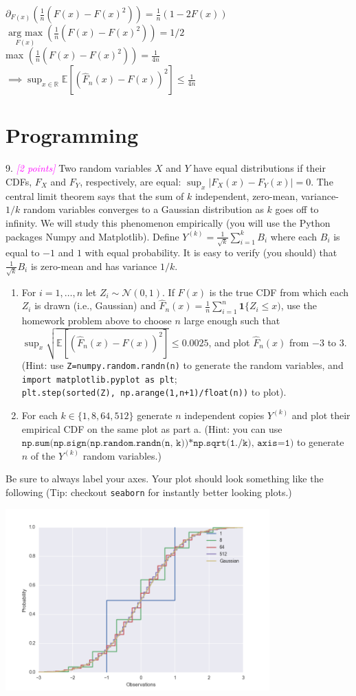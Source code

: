 \documentclass{article}
\newcommand{\field}[1]{\mathbb{#1}}
\newcommand{\1}{\mathbf{1}}
\newcommand{\E}{\mathbb{E}}
\newcommand{\R}{\field{R}} %
\newcommand{\grade}[1]{\small\textcolor{magenta}{\emph{[#1 points]}} \normalsize}
\begin{document}
\begin{enumerate}
	$\partial_{F(x)} (\frac{1}{n} (F(x)-F(x)^2))=\frac{1}{n} (1-2F(x))$\\
	$\underset{F(x)}{\operatorname{arg\ max}} (\frac{1}{n} (F(x)-F(x)^2))=1/2$\\
	max $(\frac{1}{n} (F(x)-F(x)^2))=\frac{1}{4n}$\\
	$\implies \displaystyle\sup_{x \in \R} \E[ ( \widehat{F}_n(x) - F(x) )^2 ] \leq \frac{1}{4n}$\\
	
\end{enumerate}

\section{Programming}

9. \grade{2} Two random variables $X$ and $Y$ have equal distributions if their CDFs, $F_X$ and $F_Y$, respectively, are equal: $\sup_{x} |F_X(x) - F_Y(x)| = 0$. 
The central limit theorem says that the sum of $k$ independent, zero-mean, variance-$1/k$ random variables converges to a Gaussian distribution as $k$ goes off to infinity.  
We will study this phenomenon empirically (you will use the Python packages Numpy and Matplotlib). 
Define $Y^{(k)} = \frac{1}{\sqrt{k}} \sum_{i=1}^k B_i$ where each $B_i$ is equal to $-1$ and $1$ with equal probability.
It is easy to verify (you should) that $\frac{1}{\sqrt{k}} B_i$ is zero-mean and has variance $1/k$.
\begin{enumerate}
	\item For $i=1,\dots,n$ let $Z_i \sim \mathcal{N}(0,1)$. If $F(x)$ is the true CDF from which each $Z_i$ is drawn (i.e., Gaussian) and $\widehat{F}_n(x) = \frac{1}{n} \sum_{i=1}^n \1\{ Z_i \leq x)$, use the homework problem above to choose $n$ large enough such that $\sup_x \sqrt{\E[ (\widehat{F}_n(x)-F(x))^2 ]} \leq 0.0025$, and plot $\widehat{F}_n(x)$ from $-3$ to $3$. (Hint: use \texttt{Z=numpy.random.randn(n)} to generate the random variables, and \texttt{import matplotlib.pyplot as plt};\\ \texttt{plt.step(sorted(Z), np.arange(1,n+1)/float(n))} to plot).
	\item For each $k \in \{1, 8, 64, 512\}$ generate $n$ independent copies $Y^{(k)}$ and plot their empirical CDF on the same plot as part a. (Hint: you can use $\texttt{np.sum(np.sign(np.random.randn(n, k))*np.sqrt(1./k), axis=1)}$ to generate $n$ of the $Y^{(k)}$ random variables.)
\end{enumerate}
Be sure to always label your axes. 
Your plot should look something like the following (Tip: checkout \texttt{seaborn} for instantly better looking plots.)
\begin{center}
\includegraphics[width=4in]{full.png}
\end{center} 
\end{document}
